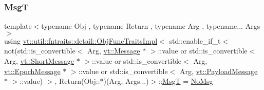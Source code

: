 \subsubsection{\texorpdfstring{MsgT}{MsgT}}
{\footnotesize\ttfamily template$<$typename Obj , typename Return , typename Arg , typename... Args$>$ \\
using \hyperlink{structvt_1_1util_1_1fntraits_1_1detail_1_1_obj_func_traits_impl}{vt\+::util\+::fntraits\+::detail\+::\+Obj\+Func\+Traits\+Impl}$<$ std\+::enable\+\_\+if\+\_\+t$<$ not(std\+::is\+\_\+convertible$<$ Arg, \hyperlink{namespacevt_a3a3ddfef40b4c90915fa43cdd5f129ea}{vt\+::\+Message} $\ast$ $>$\+::value or std\+::is\+\_\+convertible$<$ Arg, \hyperlink{namespacevt_a1125ac1da6c0bbf141e0ea0739d7602d}{vt\+::\+Short\+Message} $\ast$ $>$\+::value or std\+::is\+\_\+convertible$<$ Arg, \hyperlink{namespacevt_ad67368ffae52d7325002586b41bb150e}{vt\+::\+Epoch\+Message} $\ast$ $>$\+::value or std\+::is\+\_\+convertible$<$ Arg, \hyperlink{namespacevt_a89a92229c5622b855c02c549f83a1a68}{vt\+::\+Payload\+Message} $\ast$ $>$\+::value) $>$, Return(Obj\+::$\ast$)(Arg, Args...)$>$\+::\hyperlink{structvt_1_1util_1_1fntraits_1_1detail_1_1_obj_func_traits_impl_3_01std_1_1enable__if__t_3_01not1219121971b8d08f950169835519afd3_a75e8b554f75ee5b8e792f070e6abc00e}{MsgT} =  \hyperlink{structvt_1_1util_1_1fntraits_1_1detail_1_1_no_msg}{No\+Msg}}

